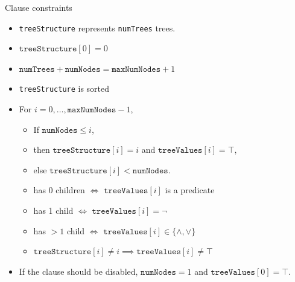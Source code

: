 \documentclass{beamer}
\begin{document}
\begin{frame}{Clause constraints}
  \begin{itemize}
  \item \texttt{treeStructure} represents \texttt{numTrees} trees.
  \item $\texttt{treeStructure}[0] = 0$
  \item $\texttt{numTrees} + \texttt{numNodes} = \texttt{maxNumNodes} + 1$
  \item \texttt{treeStructure} is sorted
  \item For $i = 0, \dots, \texttt{maxNumNodes} - 1$,
    \begin{itemize}
    \item If $\texttt{numNodes} \le i$,
    \item then $\texttt{treeStructure}[i] = i$ and $\texttt{treeValues}[i] = \top$,
    \item else $\texttt{treeStructure}[i] < \texttt{numNodes}$.
    \item has 0 children $\iff$ $\texttt{treeValues}[i]$ is a predicate
    \item has 1 child $\iff$ $\texttt{treeValues}[i] = \neg$
    \item has $>1$ child $\iff$ $\texttt{treeValues}[i] \in \{ \land, \lor \}$
    \item $\texttt{treeStructure}[i] \ne i \implies \texttt{treeValues}[i] \ne \top$
    \end{itemize}
  \item If the clause should be disabled, $\texttt{numNodes} = 1$ and
    $\texttt{treeValues}[0] = \top$.
  \end{itemize}
\end{frame}
\end{document}
